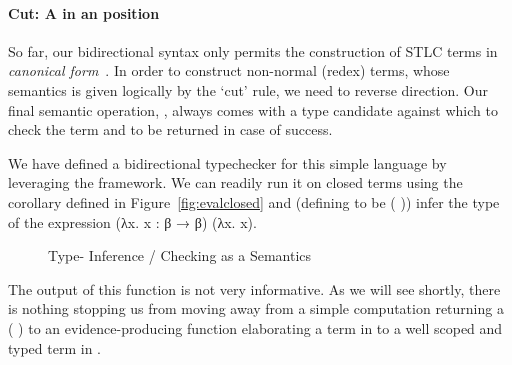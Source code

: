 \paragraph{Cut: A  in an  position} 
So far, our bidirectional syntax only permits the construction
  of STLC terms in \emph{canonical
    form}~\cite{Pfenning:04,Dunfield:2004:TT:964001.964025}. In order to construct
  non-normal (redex) terms, whose semantics is given logically by the
  `cut' rule, we need to reverse direction.
Our final semantic operation, , 
always comes with a type candidate against which to check the term and
to be returned in case of success.
\begin{agdasnippet}
\end{agdasnippet}
%
We have defined a bidirectional typechecker for this simple language by
leveraging the \semrec{} framework. We can readily run it on closed terms
using the  corollary defined in Figure~\ref{fig:evalclosed}
and (defining  to be {(  )}) infer the type of
the expression {(λx. x : β → β) (λx. x)}.

\begin{figure}[h!]
\caption{Type- Inference / Checking as a Semantics\label{defn:BidiSemantics}}
\end{figure}

The output of this function is not very informative. As we will see shortly,
there is nothing stopping us from moving away from a simple computation
returning a {( )} to an evidence-producing function
elaborating a term in  to a well scoped and typed term in .
